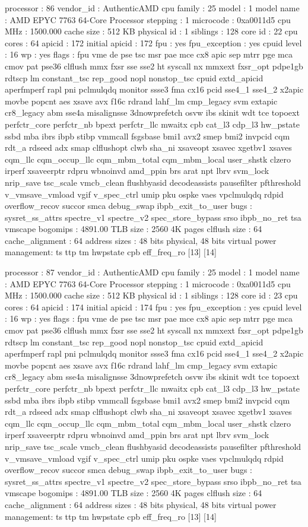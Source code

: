 processor	: 86
vendor_id	: AuthenticAMD
cpu family	: 25
model		: 1
model name	: AMD EPYC 7763 64-Core Processor
stepping	: 1
microcode	: 0xa0011d5
cpu MHz		: 1500.000
cache size	: 512 KB
physical id	: 1
siblings	: 128
core id		: 22
cpu cores	: 64
apicid		: 172
initial apicid	: 172
fpu		: yes
fpu_exception	: yes
cpuid level	: 16
wp		: yes
flags		: fpu vme de pse tsc msr pae mce cx8 apic sep mtrr pge mca cmov pat pse36 clflush mmx fxsr sse sse2 ht syscall nx mmxext fxsr_opt pdpe1gb rdtscp lm constant_tsc rep_good nopl nonstop_tsc cpuid extd_apicid aperfmperf rapl pni pclmulqdq monitor ssse3 fma cx16 pcid sse4_1 sse4_2 x2apic movbe popcnt aes xsave avx f16c rdrand lahf_lm cmp_legacy svm extapic cr8_legacy abm sse4a misalignsse 3dnowprefetch osvw ibs skinit wdt tce topoext perfctr_core perfctr_nb bpext perfctr_llc mwaitx cpb cat_l3 cdp_l3 hw_pstate ssbd mba ibrs ibpb stibp vmmcall fsgsbase bmi1 avx2 smep bmi2 invpcid cqm rdt_a rdseed adx smap clflushopt clwb sha_ni xsaveopt xsavec xgetbv1 xsaves cqm_llc cqm_occup_llc cqm_mbm_total cqm_mbm_local user_shstk clzero irperf xsaveerptr rdpru wbnoinvd amd_ppin brs arat npt lbrv svm_lock nrip_save tsc_scale vmcb_clean flushbyasid decodeassists pausefilter pfthreshold v_vmsave_vmload vgif v_spec_ctrl umip pku ospke vaes vpclmulqdq rdpid overflow_recov succor smca debug_swap ibpb_exit_to_user
bugs		: sysret_ss_attrs spectre_v1 spectre_v2 spec_store_bypass srso ibpb_no_ret tsa vmscape
bogomips	: 4891.00
TLB size	: 2560 4K pages
clflush size	: 64
cache_alignment	: 64
address sizes	: 48 bits physical, 48 bits virtual
power management: ts ttp tm hwpstate cpb eff_freq_ro [13] [14]

processor	: 87
vendor_id	: AuthenticAMD
cpu family	: 25
model		: 1
model name	: AMD EPYC 7763 64-Core Processor
stepping	: 1
microcode	: 0xa0011d5
cpu MHz		: 1500.000
cache size	: 512 KB
physical id	: 1
siblings	: 128
core id		: 23
cpu cores	: 64
apicid		: 174
initial apicid	: 174
fpu		: yes
fpu_exception	: yes
cpuid level	: 16
wp		: yes
flags		: fpu vme de pse tsc msr pae mce cx8 apic sep mtrr pge mca cmov pat pse36 clflush mmx fxsr sse sse2 ht syscall nx mmxext fxsr_opt pdpe1gb rdtscp lm constant_tsc rep_good nopl nonstop_tsc cpuid extd_apicid aperfmperf rapl pni pclmulqdq monitor ssse3 fma cx16 pcid sse4_1 sse4_2 x2apic movbe popcnt aes xsave avx f16c rdrand lahf_lm cmp_legacy svm extapic cr8_legacy abm sse4a misalignsse 3dnowprefetch osvw ibs skinit wdt tce topoext perfctr_core perfctr_nb bpext perfctr_llc mwaitx cpb cat_l3 cdp_l3 hw_pstate ssbd mba ibrs ibpb stibp vmmcall fsgsbase bmi1 avx2 smep bmi2 invpcid cqm rdt_a rdseed adx smap clflushopt clwb sha_ni xsaveopt xsavec xgetbv1 xsaves cqm_llc cqm_occup_llc cqm_mbm_total cqm_mbm_local user_shstk clzero irperf xsaveerptr rdpru wbnoinvd amd_ppin brs arat npt lbrv svm_lock nrip_save tsc_scale vmcb_clean flushbyasid decodeassists pausefilter pfthreshold v_vmsave_vmload vgif v_spec_ctrl umip pku ospke vaes vpclmulqdq rdpid overflow_recov succor smca debug_swap ibpb_exit_to_user
bugs		: sysret_ss_attrs spectre_v1 spectre_v2 spec_store_bypass srso ibpb_no_ret tsa vmscape
bogomips	: 4891.00
TLB size	: 2560 4K pages
clflush size	: 64
cache_alignment	: 64
address sizes	: 48 bits physical, 48 bits virtual
power management: ts ttp tm hwpstate cpb eff_freq_ro [13] [14]

